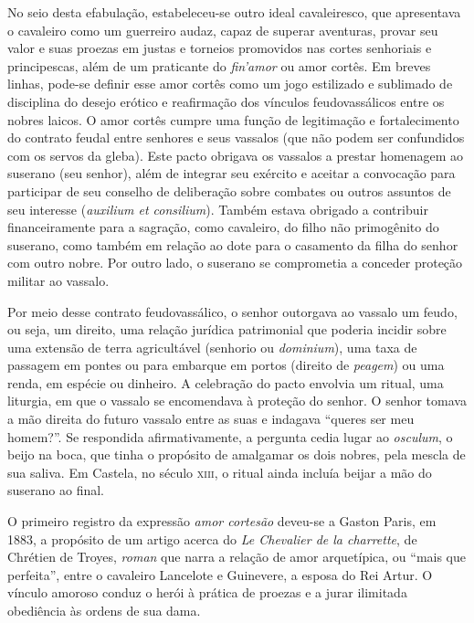 No seio desta efabulação, estabeleceu-se outro ideal cavaleiresco, que
apresentava o cavaleiro como um guerreiro audaz, capaz de superar
aventuras, provar seu valor e suas proezas em justas e torneios
promovidos nas cortes senhoriais e principescas, além de um praticante
do \textit{fin’amor} ou amor cortês. Em breves linhas, pode-se definir
esse amor cortês como um jogo estilizado e sublimado de disciplina do
desejo erótico e reafirmação dos vínculos feudovassálicos entre os
nobres laicos. O amor cortês cumpre uma função de legitimação e
fortalecimento do contrato feudal entre senhores e seus vassalos (que
não podem ser confundidos com os servos da gleba). Este pacto obrigava
os vassalos a prestar homenagem ao suserano (seu senhor), além de
integrar seu exército e aceitar a convocação para participar de seu
conselho de deliberação sobre combates ou outros assuntos de seu
interesse (\textit{auxilium et consilium}). Também estava obrigado a
contribuir financeiramente para a sagração, como cavaleiro, do filho
não primogênito do suserano, como também em relação ao dote para o
casamento da filha do senhor com outro nobre. Por outro lado, o
suserano se comprometia a conceder proteção militar ao vassalo.

Por meio desse contrato feudovassálico, o senhor outorgava ao vassalo um
feudo, ou seja, um direito, uma relação jurídica patrimonial que
poderia incidir sobre uma extensão de terra agricultável (senhorio ou
\textit{dominium}), uma taxa de passagem em pontes ou para embarque em
portos (direito de \textit{peagem}) ou uma renda, em espécie ou
dinheiro. A celebração do pacto envolvia um ritual, uma liturgia, em
que o vassalo se encomendava à proteção do senhor. O senhor tomava a
mão direita do futuro vassalo entre as suas e indagava “queres ser meu
homem?”. Se respondida afirmativamente, a pergunta cedia lugar ao
\textit{osculum}, o beijo na boca, que tinha o propósito de amalgamar
os dois nobres, pela mescla de sua saliva. Em Castela, no século \textsc{xiii},
o ritual ainda incluía beijar a mão do suserano ao final. 

O primeiro registro da expressão \textit{amor cortesão} deveu-se a
Gaston Paris, em 1883, a propósito de um artigo acerca do \textit{Le
Chevalier de la charrette}, de Chrétien de Troyes, \textit{roman} que
narra a relação de amor arquetípica, ou “mais que perfeita”, entre o
cavaleiro Lancelote e Guinevere, a esposa do Rei Artur. O vínculo
amoroso conduz o herói à prática de proezas e a jurar ilimitada
obediência às ordens de sua dama.

